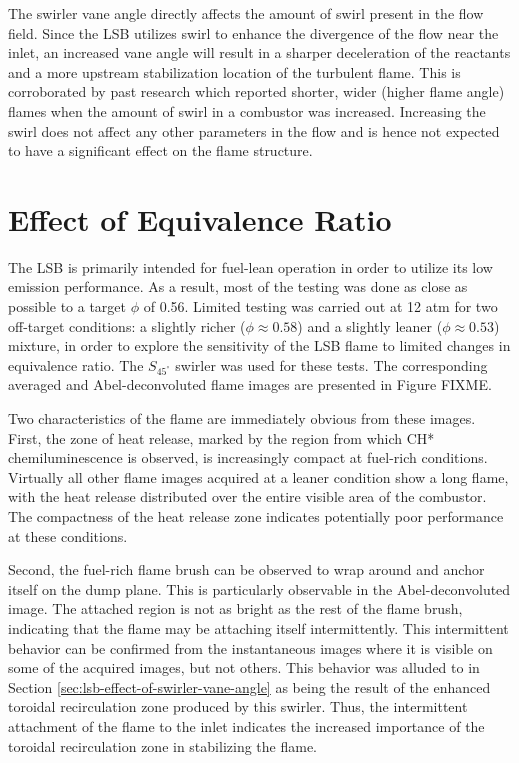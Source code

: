 The swirler vane angle directly affects the amount of swirl present in the flow field.
Since the LSB utilizes swirl to enhance the divergence of the flow near the inlet, an increased vane angle will result in a sharper deceleration of the reactants and a more upstream stabilization location of the turbulent flame.
This is corroborated by past research\cite{1986-starner} which reported shorter, wider (higher flame angle) flames when the amount of swirl in a combustor was increased.
Increasing the swirl does not affect any other parameters in the flow and is hence not expected to have a significant effect on the flame structure.

\section{Effect of Equivalence Ratio}
\label{sec:lsb-effect-of-equivalence-ratio}

The LSB is primarily intended for fuel-lean operation in order to utilize its low  emission performance.
As a result, most of the testing was done as close as possible to a target \(\phi\) of 0.56.
Limited testing was carried out at 12 atm for two off-target conditions: a slightly richer (\(\phi \approx 0.58\)) and a slightly leaner (\(\phi \approx 0.53\)) mixture, in order to explore the sensitivity of the LSB flame to limited changes in equivalence ratio.
The \(S_{45^\circ}\) swirler was used for these tests.
The corresponding averaged and Abel-deconvoluted flame images are presented in Figure FIXME.

Two characteristics of the flame are immediately obvious from these images.
First, the zone of heat release, marked by the region from which CH* chemiluminescence is observed, is increasingly compact at fuel-rich conditions.
Virtually all other flame images acquired at a leaner condition show a long flame, with the heat release distributed over the entire visible area of the combustor.
The compactness of the heat release zone indicates potentially poor  performance at these conditions.

Second, the fuel-rich flame brush can be observed to wrap around and anchor itself on the dump plane.
This is particularly observable in the Abel-deconvoluted image.
The attached region is not as bright as the rest of the flame brush, indicating that the flame may be attaching itself intermittently.
This intermittent behavior can be confirmed from the instantaneous images where it is visible on some of the acquired images, but not others.
This behavior was alluded to in Section \ref{sec:lsb-effect-of-swirler-vane-angle} as being the result of the enhanced toroidal recirculation zone produced by this swirler.
Thus, the intermittent attachment of the flame to the inlet indicates the increased importance of the toroidal recirculation zone in stabilizing the flame.

